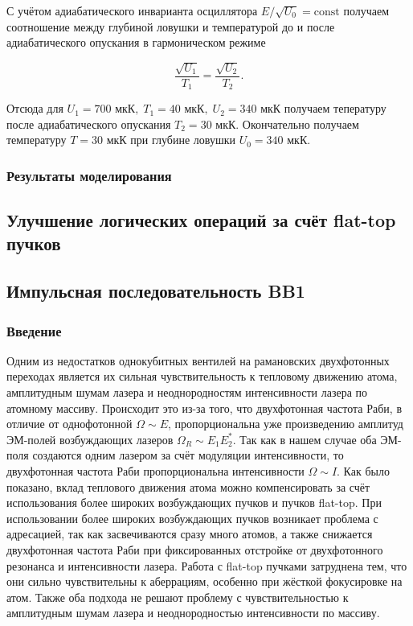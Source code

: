 С учётом адиабатического инварианта осциллятора $E/\sqrt{U_0} = \text{const}$ получаем соотношение между глубиной ловушки и температурой до и после адиабатического опускания в гармоническом режиме

\begin{equation}
	\frac{\sqrt{U_{1}}}{T_{1}} = \frac{\sqrt{U_{2}}}{T_{2}}.
\end{equation}

Отсюда для $U_{1} = 700\text{ мкК}, \; T_{1} = 40\text{ мкК}, \; U_{2} = 340\text{ мкК}$ получаем тепературу после адиабатического опускания $T_{2} = 30\text{ мкК}$. Окончательно получаем температуру $T = 30 \text{ мкК}$ при глубине ловушки $U_0 = 340\text{ мкК}$.

\subsubsection{Результаты моделирования}



\subsection{Улучшение логических операций за счёт flat-top пучков}

\subsection{Импульсная последовательность BB1}

\subsubsection{Введение}

Одним из недостатков однокубитных вентилей на рамановских двухфотонных переходах является их сильная чувствительность к тепловому движению атома, амплитудным шумам лазера и неоднородностям интенсивности лазера по атомному массиву. Происходит это из-за того, что двухфотонная частота Раби, в отличие от однофотонной $\Omega \sim E$, пропорциональна уже произведению амплитуд ЭМ-полей возбуждающих лазеров $\Omega_R \sim E_1 E_2^*$. Так как в нашем случае оба ЭМ-поля создаются одним лазером за счёт модуляции интенсивности, то двухфотонная частота Раби пропорциональна интенсивности $\Omega \sim I$. Как было показано, вклад теплового движения атома можно компенсировать за счёт использования более широких возбуждающих пучков и пучков flat-top. При использовании более широких возбуждающих пучков возникает проблема с адресацией, так как засвечиваются сразу много атомов, а также снижается двухфотонная частота Раби при фиксированных отстройке от двухфотонного резонанса и интенсивности лазера. Работа с flat-top пучками затруднена тем, что они сильно чувствительны к аберрациям, особенно при жёсткой фокусировке на атом. Также оба подхода не решают проблему с чувствительностью к амплитудным шумам лазера и неоднородностью интенсивности по массиву. 


